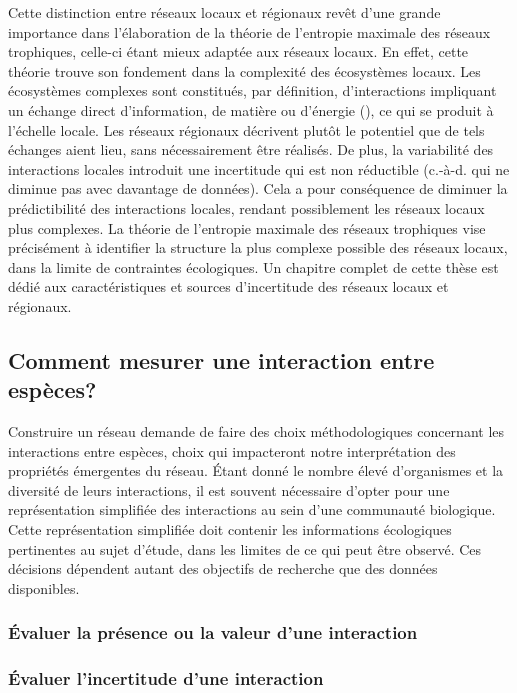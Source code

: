 Cette distinction entre réseaux locaux et régionaux revêt d'une grande
importance dans l'élaboration de la théorie de l'entropie maximale des réseaux
trophiques, celle-ci étant mieux adaptée aux réseaux locaux. En effet, cette
théorie trouve son fondement dans la complexité des écosystèmes locaux. Les
écosystèmes complexes sont constitués, par définition, d'interactions impliquant
un échange direct d'information, de matière ou d'énergie
(\cite{Ladyman2013What}), ce qui se produit à l'échelle locale. Les réseaux
régionaux décrivent plutôt le potentiel que de tels échanges aient lieu, sans
nécessairement être réalisés. De plus, la variabilité des interactions locales
introduit une incertitude qui est non réductible (c.-à-d. qui ne diminue pas
avec davantage de données). Cela a pour conséquence de diminuer la prédictibilité des
interactions locales, rendant possiblement les réseaux locaux plus complexes. La
théorie de l'entropie maximale des réseaux trophiques vise précisément à
identifier la structure la plus complexe possible des réseaux locaux, dans la
limite de contraintes écologiques. Un chapitre complet de cette thèse est dédié
aux caractéristiques et sources d'incertitude des réseaux locaux et régionaux.

\subsection{Comment mesurer une interaction entre espèces?} 

Construire un réseau demande de faire des choix méthodologiques concernant les
interactions entre espèces, choix qui impacteront notre interprétation des
propriétés émergentes du réseau. Étant donné le nombre élevé d'organismes et la
diversité de leurs interactions, il est souvent nécessaire d'opter pour une
représentation simplifiée des interactions au sein d'une communauté biologique.
Cette représentation simplifiée doit contenir les informations écologiques
pertinentes au sujet d'étude, dans les limites de ce qui peut être observé. 
Ces décisions dépendent autant des objectifs de recherche que des données
disponibles.

\subsubsection{Évaluer la présence ou la valeur d'une interaction} 

\subsubsection{Évaluer l'incertitude d'une interaction} 


